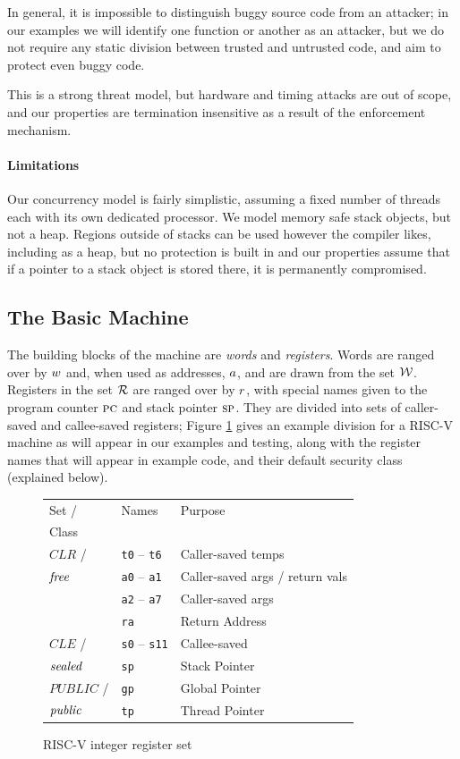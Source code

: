 \documentclass[10pt,conference]{ieeetran}%
\theoremstyle{definition}
\begin{document}
In general, it is impossible to distinguish buggy source code from an attacker; in
our examples we will identify one function or another as an attacker, but we do not
require any static division between trusted and untrusted code, and aim to protect
even buggy code.

This is a strong threat model, but hardware and timing attacks are out of scope,
and our properties are termination insensitive as a result of the enforcement mechanism.

\paragraph*{Limitations}

Our concurrency model is fairly
simplistic, assuming a fixed number of threads each with its own dedicated processor.
We model memory safe stack objects, but not a heap. Regions outside of
stacks can be used however the compiler likes, including as a heap, but no protection is
built in and our properties assume that if a pointer to a stack object is stored there,
it is permanently compromised.

\subsection{The Basic Machine}

The building blocks of the machine are {\em words} and {\em registers}.
Words are ranged over by \(w\) and, when used as addresses, \(a\),
and are drawn from the set \({\mathcal W}\).
Registers in the set \({\mathcal R}\) are ranged over by \(r\), with special names given to the
program counter \(\textsc{pc}\) and stack pointer \(\textsc{sp}\).
They are divided into sets of caller-saved and callee-saved registers;
Figure \ref{fig:RISCVregs} gives an example division for a RISC-V machine as will
appear in our examples and testing, along with the register names that will appear in
example code, and their default security class (explained below).

\begin{figure}
  \begin{tabular}{| l | l | l |}
    \hline
    Set / & Names & Purpose \\
    Class & & \\
    \hline
    \(\mathit{CLR}\) / & {\tt t0} -- {\tt t6} & Caller-saved temps \\
    \(\mathit{free}\) & {\tt a0} -- {\tt a1} & Caller-saved args / return vals \\
    & {\tt a2} -- {\tt a7} & Caller-saved args \\
    & {\tt ra} & Return Address \\
    \hline
    \(\mathit{CLE}\) / & {\tt s0} -- {\tt s11} & Callee-saved \\
    \(\mathit{sealed}\) & {\tt sp} & Stack Pointer \\  
    \hline
    \(\mathit{PUBLIC}\) / & {\tt gp} & Global Pointer  \\
    \(\mathit{public}\) & {\tt tp} & Thread Pointer \\
    \hline
  \end{tabular}
  \caption{RISC-V integer register set}
  \label{fig:RISCVregs}
\end{figure}
\end{document}
